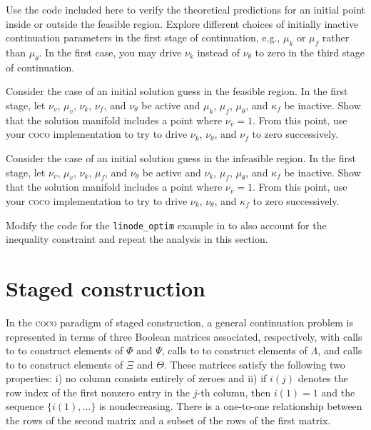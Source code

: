 \begin{exercises}
\item Use the code included here to verify the theoretical predictions for an initial point inside or outside the feasible region. Explore different choices of initially inactive continuation parameters in the first stage of continuation, e.g., $\mu_k$ or $\mu_f$ rather than $\mu_\theta$. In the first case, you may drive $\nu_k$ instead of $\nu_\theta$ to zero  in the third stage of continuation.
\item Consider the case of an initial solution guess in the feasible region. In the first stage, let $\nu_v$, $\mu_v$, $\nu_k$, $\nu_f$, and $\nu_\theta$ be active and $\mu_k$, $\mu_f$, $\mu_\theta$, and $\kappa_f$ be inactive. Show that the solution manifold includes a point where $\nu_v=1$. From this point, use your \textsc{coco} implementation to try to drive $\nu_k$, $\nu_\theta$, and $\nu_f$ to zero successively.
\item Consider the case of an initial solution guess in the infeasible region. In the first stage, let $\nu_v$, $\mu_v$, $\nu_k$, $\mu_f$, and $\nu_\theta$ be active and $\nu_k$, $\mu_f$, $\mu_\theta$, and $\kappa_f$ be inactive. Show that the solution manifold includes a point where $\nu_v=1$. From this point, use your \textsc{coco} implementation to try to drive $\nu_k$, $\nu_\theta$, and $\kappa_f$ to zero successively.
\item Modify the code for the \texttt{linode\_optim} example in  to also account for the inequality constraint and repeat the analysis in this section.
\end{exercises}


\section{Staged construction}

In the \textsc{coco} paradigm of staged construction, a general continuation problem is represented in terms of three Boolean matrices associated, respectively, with calls to  to construct elements of $\Phi$ and $\Psi$, calls to  to construct elements of $\Lambda$, and calls to  to construct elements of $\Xi$ and $\Theta$. These matrices satisfy the following two properties: i) no column consists entirely of zeroes and ii) if $i(j)$ denotes the row index of the first nonzero entry in the $j$-th column, then $i(1)=1$ and the sequence $\{i(1),\ldots\}$ is nondecreasing. There is a one-to-one relationship between the rows of the second matrix and a subset of the rows of the first matrix. 

